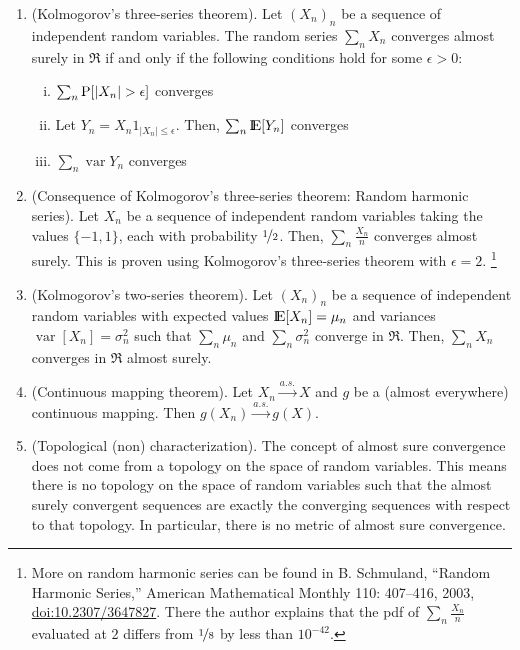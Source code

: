 \documentclass[a4paper,10pt]{scrbook}
\begin{document}
\begin{enumerate}
 \item (Kolmogorov's three-series theorem). Let $(X_n)_n$ be a sequence of independent random
       variables. The random series $\sum_{n}X_n$ converges almost surely in \(\Re\) if and only if
       the following conditions hold for some \(\epsilon>0\):
       \begin{enumerate}[i.]
        \item \(\sum_n \mathrm{P}[|X_n| > \epsilon]\) converges
        \item Let \(Y_n = X_n 1_{|X_n| \leq \epsilon}\). Then, \(\sum_n \E[Y_n]\) converges
        \item \(\sum_n \operatorname{var}Y_n\) converges
       \end{enumerate}
 \item (Consequence of Kolmogorov's three-series theorem: Random harmonic series). 
       Let \(X_n\) be a sequence of independent random variables taking the values 
       \(\{-1, 1\}\), each with probability \(\nicefrac{1}{2}\). 
       Then, \(\sum_{n}\frac{X_n}{n}\) converges almost surely. This is proven using 
       Kolmogorov's three-series theorem with \(\epsilon=2\).%
          \footnote{More on random harmonic series can be found in B. Schmuland, 
	  ``Random Harmonic Series,'' American Mathematical Monthly 110: 407--416, 2003, 
	  \href{http://www.math.nus.edu.sg/~matsr/ProbI/Lecture4.pdf}{doi:10.2307/3647827}. 
	  There the author explains that the pdf of \(\sum_{n}\frac{X_n}{n}\)
	  evaluated at \(2\) differs from \(\nicefrac{1}{8}\) by less than \(10^{-42}\).}
 \item (Kolmogorov's two-series theorem).  Let $(X_n)_n$ be a sequence of independent random
       variables with expected values \(\E[X_n] = \mu_n\) and variances \(\operatorname{var}[X_n] 
       = \sigma_n^2\) such that \(\sum_n \mu_n\) and \(\sum_n \sigma_n^2\) converge in \(\Re\). Then, 
       \(\sum_n X_n\) converges in \(\Re\) almost surely.
       
       
 \item (Continuous mapping theorem). Let $X_n \overset{a.s.}{\to} X$ and $g$ be a (almost everywhere)
       continuous mapping. Then
       $g(X_n) \overset{a.s.}{\to} g(X)$.
       
 \item (Topological (non) characterization).
       The concept of almost sure convergence does not come from a topology on the space 
       of random variables. This means there is no topology on the space of random variables 
       such that the almost surely convergent sequences are exactly the converging sequences 
       with respect to that topology. In particular, there is no metric of almost sure convergence.        
              
\end{enumerate}
\end{document}
